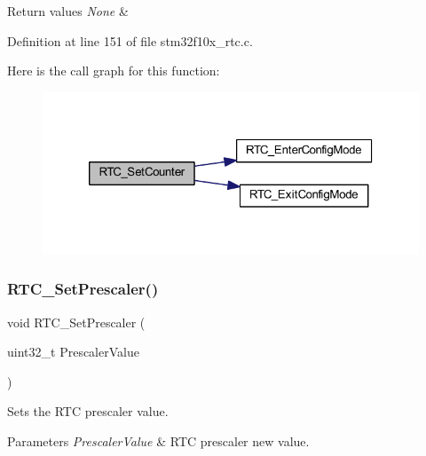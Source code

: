 \begin{DoxyRetVals}{Return values}
{\em None} & \\
\hline
\end{DoxyRetVals}


Definition at line 151 of file stm32f10x\+\_\+rtc.\+c.

Here is the call graph for this function\+:
\nopagebreak
\begin{figure}[H]
\begin{center}
\leavevmode
\includegraphics[width=320pt]{group___r_t_c___exported___functions_gafa81ec17158de1d1a7740eca81b9fb65_cgraph}
\end{center}
\end{figure}
\mbox{\label{group___r_t_c___exported___functions_gaf76be6071d1ba65b009e0791069e602c}} 
\subsubsection{\texorpdfstring{R\+T\+C\+\_\+\+Set\+Prescaler()}{RTC\_SetPrescaler()}}
{\footnotesize\ttfamily void R\+T\+C\+\_\+\+Set\+Prescaler (\begin{DoxyParamCaption}\item[{uint32\+\_\+t}]{Prescaler\+Value }\end{DoxyParamCaption})}



Sets the R\+TC prescaler value. 


\begin{DoxyParams}{Parameters}
{\em Prescaler\+Value} & R\+TC prescaler new value. \\
\hline
\end{DoxyParams}

